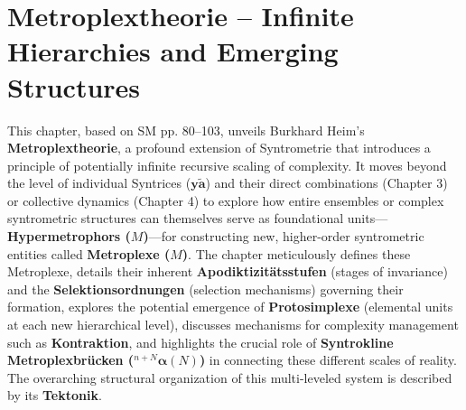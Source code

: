 \documentclass[12pt]{article}
\newcommand{\syntrix}{\bm{y\widetilde{a}}}
\def\metroplex#1#2{M}%
\newcommand{\hypermetrophor}[1]{%
  \metroplex{#1}{a}%
}
\newcommand{\syntroklinebruecke}[1]{{}^{#1}\bm{\alpha}}
\begin{document}
\clearpage
\section{Metroplextheorie – Infinite Hierarchies and Emerging Structures}
\label{sec:chapter5}

This chapter, based on SM pp. 80–103, unveils Burkhard Heim's \textbf{Metroplextheorie}, a profound extension of Syntrometrie that introduces a principle of potentially infinite recursive scaling of complexity. It moves beyond the level of individual Syntrices (\(\syntrix\)) and their direct combinations (Chapter 3) or collective dynamics (Chapter 4) to explore how entire ensembles or complex syntrometric structures can themselves serve as foundational units—\textbf{Hypermetrophors (\(\hypermetrophor{n-1}\))}—for constructing new, higher-order syntrometric entities called \textbf{Metroplexe (\(\metroplex{n}{}\))}. The chapter meticulously defines these Metroplexe, details their inherent \textbf{Apodiktizitätsstufen} (stages of invariance) and the \textbf{Selektionsordnungen} (selection mechanisms) governing their formation, explores the potential emergence of \textbf{Protosimplexe} (elemental units at each new hierarchical level), discusses mechanisms for complexity management such as \textbf{Kontraktion}, and highlights the crucial role of \textbf{Syntrokline Metroplexbrücken (\(\syntroklinebruecke{n+N}(N)\))} in connecting these different scales of reality. The overarching structural organization of this multi-leveled system is described by its \textbf{Tektonik}.
\end{document}

